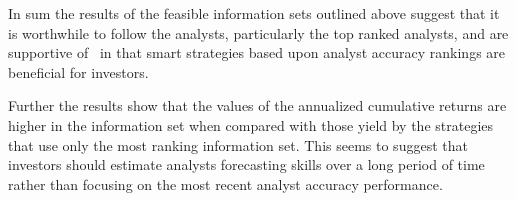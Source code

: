 \documentclass[a4paper,twoside,12pt,openright,notitlepage]{report}\usepackage[]{graphicx}\usepackage[]{color}
\begin{document}

In sum the results of the feasible information sets outlined above suggest that  it is worthwhile to follow the analysts, particularly the top ranked analysts, and are supportive of~\cite{desai2000ass} in that smart strategies based upon analyst accuracy rankings are beneficial for investors.

Further the results show that the values of the annualized cumulative returns are higher in the  information set when compared with those yield by the strategies that use only the most \naive{} ranking information set. This seems to suggest that investors should estimate analysts forecasting skills over a long period of time rather than focusing on the most recent analyst accuracy performance.


\end{document}
